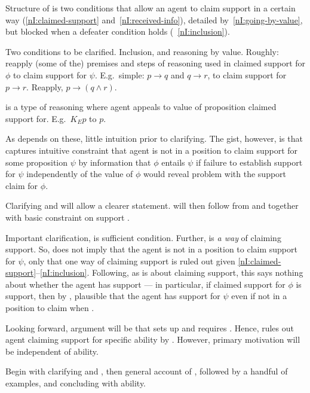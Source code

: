\begin{note}
  Structure of \nI{} is two conditions that allow an agent to claim support in a certain way (\ref{nI:claimed-support} and~\ref{nI:received-info}), detailed by~\ref{nI:going-by-value}, but blocked when a defeater condition holds (~\ref{nI:inclusion}).

  Two conditions to be clarified.
  Inclusion, and reasoning by value.
  Roughly:
  \incl{} reapply (some of the) premises and steps of reasoning used in claimed support for \(\phi\) to claim support for \(\psi\).
  E.g.\ simple: \(p \rightarrow q\) and \(q \rightarrow r\), to claim support for \(p \rightarrow r\).
  Reapply, \(p \rightarrow (q \land r)\).

  \RBV{} is a type of reasoning where agent appeals to value of proposition claimed support for.
  E.g.\ \(K_{E}p\) to \(p\).

  As \nI{} depends on these, little intuition prior to clarifying.
  The gist, however, is that \nI{} captures intuitive constraint that agent is not in a position to claim support for some proposition \(\psi\) by information that \(\phi\) entails \(\psi\) if failure to establish support for \(\psi\) independently of the value of \(\phi\) would reveal problem with the support claim for \(\phi\).

  Clarifying \incl{} and \RBV{} will allow a clearer statement.
  \nI{} will then follow from \incl{} and \RBV{} together with basic constraint on support \eiS{}.

  Important clarification, \nI{} is sufficient condition.
  Further, \RBV{} is \emph{a way} of claiming support.
  So, \nI{} does not imply that the agent is not in a position to claim support for \(\psi\), only that one way of claiming support is ruled out given \ref{nI:claimed-support}--\ref{nI:inclusion}.
  Following, as \nI{} is about claiming support, this says nothing about whether the agent has support --- in particular, if claimed support for \(\phi\) is support, then by \incl{}, plausible that the agent has support for \(\psi\) even if not in a position to claim when \RBV{}.

  Looking forward, argument will be that \gsi{} sets up \incl{} and \AR{} requires \RBV{}.
  Hence, \nI{} rules out agent claiming support for specific ability by \AR{}.
  However, primary motivation will be independent of ability.

  Begin with clarifying \incl{} and \RBV{}, then general account of \nI{}, followed by a handful of examples, and concluding with ability.
\end{note}

